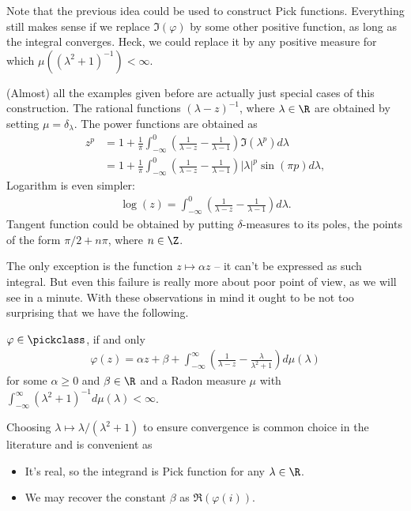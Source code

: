 Note that the previous idea could be used to construct Pick functions. Everything still makes sense if we replace $\Im(\varphi)$ by some other positive function, as long as the integral converges. Heck, we could replace it by any positive measure for which $\mu((\lambda^2 + 1)^{-1}) < \infty$.

(Almost) all the examples given before are actually just special cases of this construction. The rational functions $(\lambda - z)^{-1}$, where $\lambda \in \R$ are obtained by setting $\mu = \delta_{\lambda}$. The power functions are obtained as
\begin{align*}
	z^{p} &= 1 + \frac{1}{\pi}\int_{-\infty}^{0} \left(\frac{1}{\lambda - z} - \frac{1}{\lambda - 1}\right) \Im(\lambda^{p}) d \lambda \\
	&=1 + \frac{1}{\pi}\int_{-\infty}^{0} \left(\frac{1}{\lambda - z} - \frac{1}{\lambda - 1}\right) |\lambda|^{p} \sin(\pi p) d \lambda,
\end{align*}
Logarithm is even simpler:
\begin{align*}
	\log(z) = \int_{-\infty}^{0} \left(\frac{1}{\lambda - z} - \frac{1}{\lambda - 1}\right) d \lambda.
\end{align*}
Tangent function could be obtained by putting $\delta$-measures to its poles, the points of the form $\pi/2 + n \pi$, where $n \in \Z$.

The only exception is the function $z \mapsto \alpha z$ -- it can't be expressed as such integral. But even this failure is really more about poor point of view, as we will see in a minute. With these observations in mind it ought to be not too surprising that we have the following.

\begin{lause}\label{pick_nevanlinna_herglotz_representation_theorem}
	$\varphi \in \pickclass$, if and only
	\begin{align}\label{pick_representation}
		\varphi(z) = \alpha z + \beta + \int_{-\infty}^{\infty} \left(\frac{1}{\lambda - z} - \frac{\lambda}{\lambda^2 + 1}\right) d \mu(\lambda)
	\end{align}
	for some $\alpha \geq 0$ and $\beta \in \R$ and a Radon measure $\mu$ with $\int_{-\infty}^{\infty} (\lambda^2 + 1)^{-1} d \mu(\lambda) < \infty$.
\end{lause}

Choosing $\lambda \mapsto \lambda/(\lambda^2 + 1)$ to ensure convergence is common choice in the literature and is convenient as
\begin{itemize}
	\item It's real, so the integrand is Pick function for any $\lambda \in \R$.
	\item We may recover the constant $\beta$ as $\Re(\varphi(i))$.
\end{itemize}

